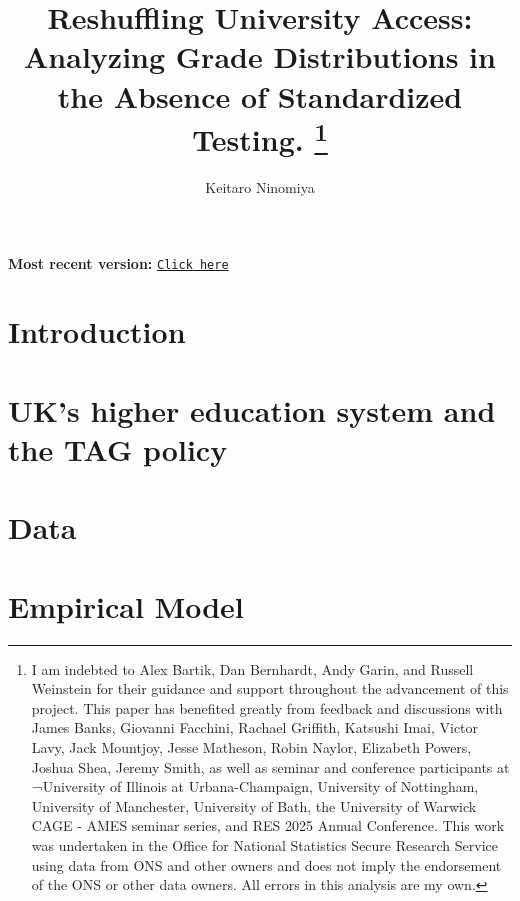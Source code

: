 \documentclass[12pt]{article}
\title{Reshuffling University Access: Analyzing Grade Distributions in the Absence of Standardized Testing. \thanks{I am indebted to Alex Bartik, Dan Bernhardt, Andy Garin, and Russell Weinstein for their
guidance and support throughout the advancement of this project. This
paper has benefited greatly from feedback and discussions with James Banks, Giovanni Facchini, Rachael Griffith, Katsushi Imai, Victor Lavy, Jack Mountjoy, Jesse Matheson, Robin Naylor, Elizabeth Powers, Joshua Shea, Jeremy Smith, as well as seminar and conference participants
at  ¬University of Illinois at Urbana-Champaign, University of Nottingham, University of Manchester, University of Bath, the University of Warwick CAGE - AMES seminar series, and RES 2025 Annual Conference. This work was undertaken in the Office for National Statistics Secure Research Service using data from ONS and other owners and does not imply the endorsement of the ONS or other data owners. All errors in this analysis are my own.}}
\author{Keitaro Ninomiya}
\date{}
\begin{document}
\maketitle
\vspace{-3em}

\begin{center}
\begin{tcolorbox}[colback=gray!5!white, colframe=gray!30!black, boxrule=0.3pt, arc=2pt, width=0.8\textwidth]
\centering
\small
\textbf{Most recent version:} 
\href{https://www.dropbox.com/scl/fi/7we8wwl1abx47vjtfhps5/Keitaro_JMP_final.pdf?rlkey=xoz14z55ycpzd010twp8az39l&st=zxydn9yl&dl=0}{\texttt{Click here}}
\end{tcolorbox}
\end{center}




\begin{abstract}

\end{abstract}
\thispagestyle{empty}

\newpage
\setcounter{page}{1}      %



\section{Introduction}

%

\section{UK's higher education system and the TAG policy}


\section{Data}


\section{Empirical Model}


%

%
\end{document}
